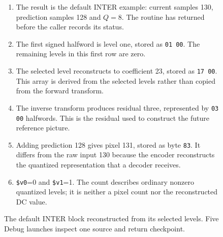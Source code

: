 \begin{figure}[htbp]
  \par\smallskip
  \begin{minipage}{\linewidth}
    \small
    \begin{enumerate}
      \item The result is the default INTER example: current samples 130, prediction samples 128 and $Q=8$. The routine has returned before the caller records its status.
      \item The first signed halfword is level one, stored as \texttt{01 00}. The remaining levels in this first row are zero.
      \item The selected level reconstructs to coefficient 23, stored as \texttt{17 00}. This array is derived from the selected levels rather than copied from the forward transform.
      \item The inverse transform produces residual three, represented by \texttt{03 00} halfwords. This is the residual used to construct the future reference picture.
      \item Adding prediction 128 gives pixel 131, stored as byte \texttt{83}. It differs from the raw input 130 because the encoder reconstructs the quantized representation that a decoder receives.
      \item \texttt{\$v0}=0 and \texttt{\$v1}=1. The count describes ordinary nonzero quantized levels; it is neither a pixel count nor the reconstructed DC value.
    \end{enumerate}
  \end{minipage}
  \caption{The default INTER block reconstructed from its selected levels. Five Debug launches inspect one source and return checkpoint.}
  \label{fig:h263-block-reconstruction}
\end{figure}
